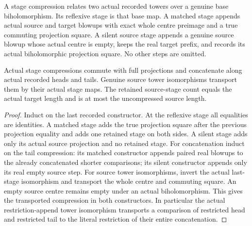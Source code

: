 \begin{definition}
\label{hir:general-nc-open-actual-stage-compression}
\leanok
A stage compression relates two actual recorded towers over a genuine base
biholomorphism. Its reflexive stage is that base map. A matched stage appends
actual source and target blowups with exact whole centre preimage and a true
commuting projection square. A silent source stage appends a genuine source
blowup whose actual centre is empty, keeps the real target prefix, and records
its actual biholomorphic projection square. No other steps are omitted.
\end{definition}

\begin{lemma}
\label{hir:general-nc-open-actual-compression-algebra}
\leanok
Actual stage compressions commute with full projections and concatenate along
actual recorded heads and tails. Genuine source tower isomorphisms transport
them by their actual stage maps. The retained source-stage count equals the
actual target length and is at most the uncompressed source length.
\end{lemma}
\begin{proof}
Induct on the last recorded constructor. At the reflexive stage all equalities
are identities. A matched stage adds the true projection square after the
previous projection equality and adds one retained stage on both sides. A
silent stage adds only its actual source projection and no retained stage.
For concatenation induct on the tail compression: its matched constructor
appends paired real blowups to the already concatenated shorter comparisons;
its silent constructor appends only its real empty source step. For source
tower isomorphisms, invert the actual last-stage isomorphism and transport the
whole centre and commuting square. An empty source centre remains empty under
an actual biholomorphism. This gives the transported compression in both
constructors. In particular the actual restriction-append tower isomorphism
transports a comparison of restricted head and restricted tail to the literal
restriction of their entire concatenation.
\end{proof}

